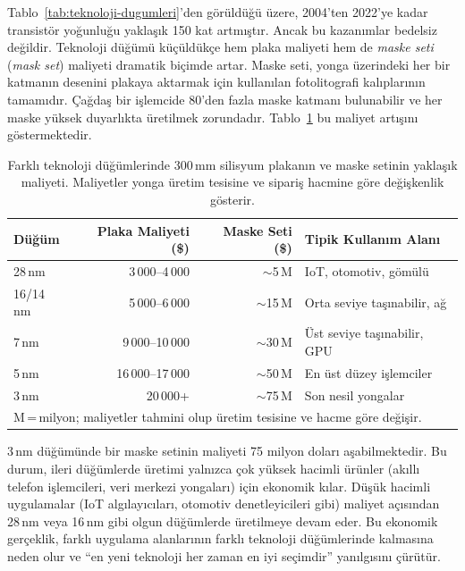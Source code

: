 Tablo~\ref{tab:teknoloji-dugumleri}'den görüldüğü üzere, 2004'ten 2022'ye kadar transistör yoğunluğu yaklaşık 150 kat artmıştır. Ancak bu kazanımlar bedelsiz değildir. Teknoloji düğümü küçüldükçe hem plaka maliyeti hem de \emph{maske seti} (\emph{mask set}) maliyeti dramatik biçimde artar. Maske seti, yonga üzerindeki her bir katmanın desenini plakaya aktarmak için kullanılan fotolitografi kalıplarının tamamıdır. Çağdaş bir işlemcide 80'den fazla maske katmanı bulunabilir ve her maske yüksek duyarlıkta üretilmek zorundadır. Tablo~\ref{tab:plaka-maliyetleri} bu maliyet artışını göstermektedir.

\begin{table}[ht!]
\centering
\caption[Teknoloji düğümlerine göre üretim maliyetleri]{Farklı teknoloji düğümlerinde 300\,mm silisyum plakanın ve maske setinin yaklaşık maliyeti. Maliyetler yonga üretim tesisine ve sipariş hacmine göre değişkenlik gösterir.}
\label{tab:plaka-maliyetleri}
\footnotesize
\begin{tabular}{lrrl}
\toprule
\textbf{Düğüm} & \textbf{Plaka Maliyeti (\$)} & \textbf{Maske Seti (\$)} & \textbf{Tipik Kullanım Alanı} \\
\midrule
28\,nm    & 3\,000--4\,000     & ${\sim}$5\,M    & IoT, otomotiv, gömülü \\
16/14\,nm & 5\,000--6\,000     & ${\sim}$15\,M   & Orta seviye taşınabilir, ağ \\
7\,nm     & 9\,000--10\,000    & ${\sim}$30\,M   & Üst seviye taşınabilir, GPU \\
5\,nm     & 16\,000--17\,000   & ${\sim}$50\,M   & En üst düzey işlemciler \\
3\,nm     & 20\,000+           & ${\sim}$75\,M   & Son nesil yongalar \\
\bottomrule
\multicolumn{4}{l}{\scriptsize M\,=\,milyon; maliyetler tahmini olup üretim tesisine ve hacme göre değişir.}
\end{tabular}
\end{table}

3\,nm düğümünde bir maske setinin maliyeti 75 milyon doları aşabilmektedir. Bu durum, ileri düğümlerde üretimi yalnızca çok yüksek hacimli ürünler (akıllı telefon işlemcileri, veri merkezi yongaları) için ekonomik kılar. Düşük hacimli uygulamalar (IoT algılayıcıları, otomotiv denetleyicileri gibi) maliyet açısından 28\,nm veya 16\,nm gibi olgun düğümlerde üretilmeye devam eder. Bu ekonomik gerçeklik, farklı uygulama alanlarının farklı teknoloji düğümlerinde kalmasına neden olur ve ``en yeni teknoloji her zaman en iyi seçimdir'' yanılgısını çürütür.


